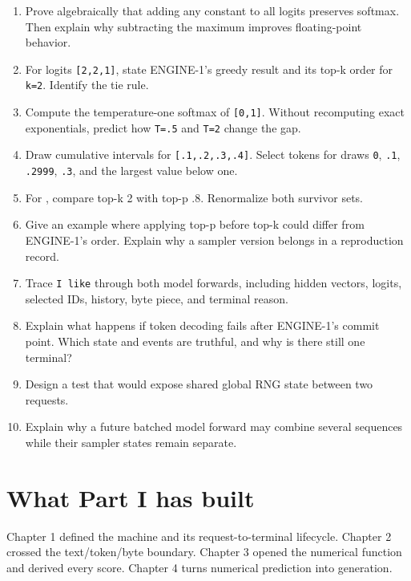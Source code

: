\begin{enumerate}
\def\labelenumi{\arabic{enumi}.}
\tightlist
\item
  Prove algebraically that adding any constant to all logits preserves
  softmax. Then explain why subtracting the maximum improves
  floating-point behavior.
\item
  For logits \texttt{{[}2,2,1{]}}, state ENGINE-1's greedy result and
  its top-k order for \texttt{k=2}. Identify the tie rule.
\item
  Compute the temperature-one softmax of \texttt{{[}0,1{]}}. Without
  recomputing exact exponentials, predict how \texttt{T=.5} and
  \texttt{T=2} change the gap.
\item
  Draw cumulative intervals for \texttt{{[}.1,.2,.3,.4{]}}. Select
  tokens for draws \texttt{0}, \texttt{.1}, \texttt{.2999}, \texttt{.3},
  and the largest value below one.
\item
  For \texttt{\seqsplit{[.40,.30,.15,.10,.05]}}, compare top-k 2 with
  top-p .8. Renormalize both survivor sets.
\item
  Give an example where applying top-p before top-k could differ from
  ENGINE-1's order. Explain why a sampler version belongs in a
  reproduction record.
\item
  Trace \texttt{I\ like} through both model forwards, including hidden
  vectors, logits, selected IDs, history, byte piece, and terminal
  reason.
\item
  Explain what happens if token decoding fails after ENGINE-1's commit
  point. Which state and events are truthful, and why is there still one
  terminal?
\item
  Design a test that would expose shared global RNG state between two
  requests.
\item
  Explain why a future batched model forward may combine several
  sequences while their sampler states remain separate.
\end{enumerate}

\section{What Part I has built}\label{what-part-i-has-built}

Chapter 1 defined the machine and its request-to-terminal lifecycle.
Chapter 2 crossed the text/token/byte boundary. Chapter 3 opened the
numerical function and derived every score. Chapter 4 turns numerical
prediction into generation.


